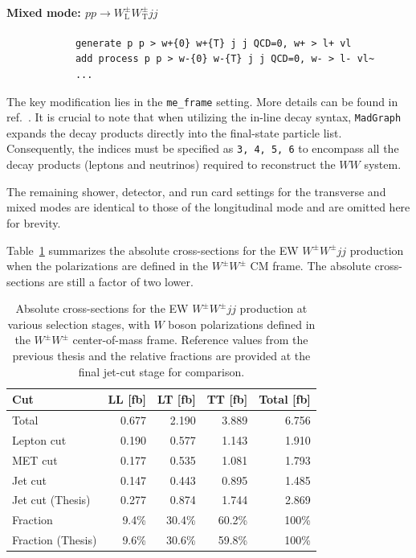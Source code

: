 \documentclass[12pt]{article}
\begin{document}
        \paragraph{Mixed mode: $pp \to W^{\pm}_{\text{L}}W^{\pm}_{\text{T}} jj$}
        \begin{lstlisting}
            generate p p > w+{0} w+{T} j j QCD=0, w+ > l+ vl
            add process p p > w-{0} w-{T} j j QCD=0, w- > l- vl~
            ...
        \end{lstlisting}

        The key modification lies in the \verb|me_frame| setting. More details can be found in ref.~\cite{BuarqueFranzosi:2019boy}. It is crucial to note that when utilizing the in-line decay syntax, \verb|MadGraph| expands the decay products directly into the final-state particle list. Consequently, the indices must be specified as \verb|3, 4, 5, 6| to encompass all the decay products (leptons and neutrinos) required to reconstruct the $WW$ system.

        The remaining shower, detector, and run card settings for the transverse and mixed modes are identical to those of the longitudinal mode and are omitted here for brevity.

        Table~\ref{tab:EW_WWjj_abs_cross_section_ww_cmf} summarizes the absolute cross-sections for the EW $W^{\pm}W^{\pm}jj$ production when the polarizations are defined in the $W^{\pm}W^{\pm}$ CM frame. The absolute cross-sections are still a factor of two lower.
        \begin{table}[htpb]
            \centering
            \caption{Absolute cross-sections for the EW $W^{\pm}W^{\pm}jj$ production at various selection stages, with $W$ boson polarizations defined in the $W^{\pm}W^{\pm}$ center-of-mass frame. Reference values from the previous thesis and the relative fractions are provided at the final jet-cut stage for comparison.}
            \label{tab:EW_WWjj_abs_cross_section_ww_cmf}
            \begin{tabular}{l|rrrr}
                \hline
                Cut & LL [fb] & LT [fb] & TT [fb] & Total [fb] \\ \hline
                Total            & 0.677 & 2.190  & 3.889  & 6.756 \\
                Lepton cut       & 0.190 & 0.577  & 1.143  & 1.910 \\
                MET cut          & 0.177 & 0.535  & 1.081  & 1.793 \\
                Jet cut          & 0.147 & 0.443  & 0.895  & 1.485 \\ \hline
                Jet cut (Thesis) & 0.277 & 0.874  & 1.744  & 2.869 \\ \hline
                Fraction         & 9.4\% & 30.4\% & 60.2\% & 100\% \\
                Fraction (Thesis)& 9.6\% & 30.6\% & 59.8\% & 100\% \\ \hline
            \end{tabular}
        \end{table}
\end{document}
